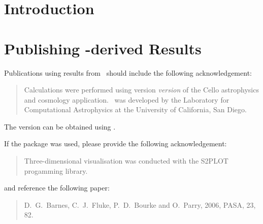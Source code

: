 \documentclass{book}
\begin{document}
\tableofcontents

\chapter{Introduction} \label{s:intro}




\chapter{Publishing \cello-derived Results}

Publications using results from \cello\ should include the following
acknowledgement:

\begin{quotation}
Calculations were performed using version \textit{version} of the
Cello astrophysics and cosmology application.  \cello\ was developed
by the Laboratory for Computational Astrophysics at the University of
California, San Diego.
\end{quotation}


The version can be obtained using .  


If the  package was used, please provide the following
acknowledgement:

\begin{quotation}
  Three-dimensional visualisation was conducted with the S2PLOT
   progamming library.
\end{quotation}

and reference the following paper:

\begin{quotation}
  D.~G.~Barnes, C.~J.~Fluke, P.~D.~Bourke and O.~Parry, 2006, PASA, 23, 82.
\end{quotation}
\end{document}
